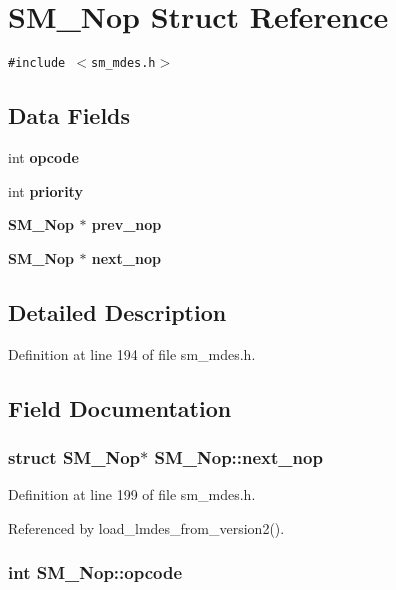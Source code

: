 \section{SM\_\-Nop Struct Reference}
\label{structSM__Nop}
{\tt \#include $<$sm\_\-mdes.h$>$}

\subsection*{Data Fields}
\begin{CompactItemize}
\item 
int \bf{opcode}
\item 
int \bf{priority}
\item 
\bf{SM\_\-Nop} $\ast$ \bf{prev\_\-nop}
\item 
\bf{SM\_\-Nop} $\ast$ \bf{next\_\-nop}
\end{CompactItemize}


\subsection{Detailed Description}




Definition at line 194 of file sm\_\-mdes.h.

\subsection{Field Documentation}
\subsubsection{\setlength{\rightskip}{0pt plus 5cm}struct \bf{SM\_\-Nop}$\ast$ \bf{SM\_\-Nop::next\_\-nop}}\label{structSM__Nop_6a6ee187be3ec08b6255f1d28a178ef6}




Definition at line 199 of file sm\_\-mdes.h.

Referenced by load\_\-lmdes\_\-from\_\-version2().
\subsubsection{\setlength{\rightskip}{0pt plus 5cm}int \bf{SM\_\-Nop::opcode}}\label{structSM__Nop_7250f151a48e6fb190ae6bd8aa1d9bd9}




